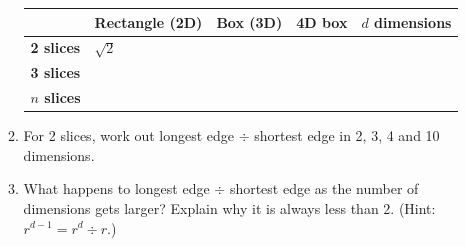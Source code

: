 \documentclass[11pt,a4paper]{article}
\renewcommand{\arraystretch}{1.25}
\begin{document}
\begin{enumerate}[resume]
\begin{enumerate}
        \vspace{1pt}
        {\small\renewcommand{\arraystretch}{1.3}
        \begin{tabular}{|l|*{4}{C{2.75cm}|}}
        \hline
        & \textbf{Rectangle (2D)} & \textbf{Box (3D)} & \textbf{4D box}
          & \textbf{$d$ dimensions}\\ \hline
        \textbf{2 slices} & $\sqrt{2}$ & & & \\ \hline
        \textbf{3 slices} & & & & \\ \hline
        \textbf{$n$ slices} & & & & \\ \hline
        \end{tabular}}
  \item For 2 slices, work out longest edge $\div$ shortest edge in 2, 3, 4
        and 10 dimensions.
  \item What happens to longest edge $\div$ shortest edge as the number of
        dimensions gets larger? Explain why it is always less than $2$.
        (Hint: $r^{d-1}=r^d\div r$.)
\end{enumerate}


\end{enumerate}
\end{document}

